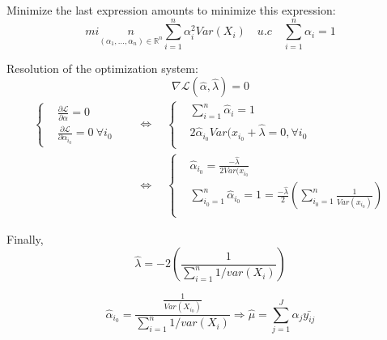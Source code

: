 \documentclass[unknownkeysallowed]{beamer}
\begin{document}
\begin{frame}
Minimize the last expression amounts to minimize this expression: 
    $$ min\limits_{(\alpha_{1},...,\alpha_{n})\in \mathbb{R}^{n}} \sum\limits_{i=1}^{n}\alpha_{i}^{2}Var(X_{i}) \quad u.c \quad  \sum\limits_{i=1}^{n}\alpha_{i}=1 $$
\begin{itemize}\setlength{\itemsep}{5pt}
\end{itemize}
Resolution of the optimization system:
\[\nabla \mathcal{L}(\hat\alpha,\hat\lambda)=0\]
\[
\begin{aligned}
\begin{cases}
&  \frac{\partial \mathcal{L}}{\partial \alpha}=0 \\
&  \frac{\partial \mathcal{L}}{\partial \alpha_{i_0}}=0\ \forall i_0 
\end{cases}
\quad&\Longleftrightarrow\quad
\begin{cases}
&  \sum\limits_{i=1}^{n}\hat{\alpha}_i=1 \\
&  2\hat\alpha_{i_0}Var(x_{i_0} + \hat\lambda =0, \forall{i_0}  \\
\end{cases}\\
& \Longleftrightarrow\quad
\begin{cases}
&  \hat\alpha_{i_0}=\frac{-\hat\lambda}{2Var(x_{i_0}} \\
& \sum\limits_{i_{0}=1}^{n}\hat{\alpha}_i_{0}=1=\frac{-\hat\lambda}{2}(\sum_{i_{0}=1}^{n}\frac{1}{Var(x_{i_0})}) \\

\end{cases}
\end{aligned}
\]
\end{frame}
\begin{frame}
    Finally, $$ \hat \lambda = -2(\frac{1}{\sum_{i=1}^{n}1/var(X_{i})})$$
    
     $$\hat\alpha_{i_0}=\frac{\frac{1}{Var(X_i_0)}}{\sum_{i=1}^{n}1/var(X_{i})} 
    \Longrightarrow \hat\mu = \sum_{j=1}^{J}\alpha_{j}\bar{y_{ij}}$$
\end{frame}
\end{document}
